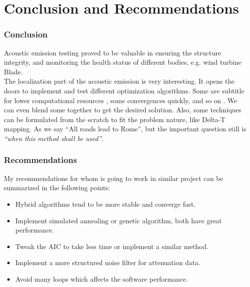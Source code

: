 
\large
\part{Conclusion and Recommendations}
\section{Conclusion}
Acoustic emission testing proved to be valuable in ensuring the
structure integrity, and monitoring the health status of different
bodies, e.g. wind turbine Blade.\\
The localization part of the acoustic emission is very interesting. It
opens the doors to implement and test different optimization algorithms.
Some are subtitle for lower computational resources , some convergences
quickly, and so on . We can even blend some together to get the desired
solution. Also, some techniques can be formulated from the scratch to
fit the problem nature, like Delta-T mapping. As we say ``All roads lead
to Rome'', but the important question still is \emph{``when this method
shall be used''}.

\section{Recommendations}
My recommendations for whom is going to work in similar project can be
summarized in the following points:

\begin{itemize}
\item
  Hybrid algorithms tend to be more stable and converge fast.
\item
  Implement simulated annealing or genetic algorithm, both have great
  performance.
\item
  Tweak the AIC to take less time or implement a similar method.
\item
  Implement a more structured noise filter for attenuation data.
\item
  Avoid many loops which affects the software performance.
\end{itemize}
